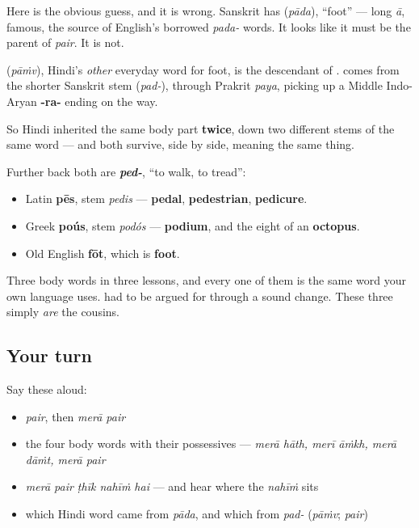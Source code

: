 \begin{cousinweb}
Here is the obvious guess, and it is wrong. Sanskrit has \textbf{} (\emph{pāda}), \textquotedblleft{}foot\textquotedblright{} — long \emph{ā}, famous, the source of English's borrowed \emph{pada-} words. It looks like it must be the parent of \emph{pair}. It is not.

\textbf{} (\emph{pāṁv}), Hindi's \emph{other} everyday word for foot, is the descendant of \textbf{}. \textbf{} comes from the shorter Sanskrit stem \textbf{} (\emph{pad-}), through Prakrit \emph{paya}, picking up a Middle Indo-Aryan \textbf{-ra-} ending on the way.

So Hindi inherited the same body part \textbf{twice}, down two different stems of the same word — and both survive, side by side, meaning the same thing.

Further back both are \emph{\textbf{ped-}}, \textquotedblleft{}to walk, to tread\textquotedblright{}:

\begin{itemize}
\raggedright
  \item Latin \textbf{pēs}, stem \emph{pedis} — \textbf{pedal}, \textbf{pedestrian}, \textbf{pedicure}.
  \item Greek \textbf{poús}, stem \emph{podós} — \textbf{podium}, and the eight of an \textbf{octopus}.
  \item Old English \textbf{fōt}, which is \textbf{foot}.
\end{itemize}

Three body words in three lessons, and every one of them is the same word your own language uses. \textbf{} had to be argued for through a sound change. These three simply \emph{are} the cousins.
\end{cousinweb}

\subsection*{Your turn}
Say these aloud:

\begin{itemize}
\raggedright
  \item \emph{pair}, then \emph{merā pair}
  \item the four body words with their possessives — \emph{merā hāth, merī āṁkh, merā dāṁt, merā pair}
  \item \emph{merā pair ṭhīk nahīṁ hai} — and hear where the \emph{nahīṁ} sits
  \item which Hindi word came from \emph{pāda}, and which from \emph{pad-} (\emph{pāṁv}; \emph{pair})
\end{itemize}

